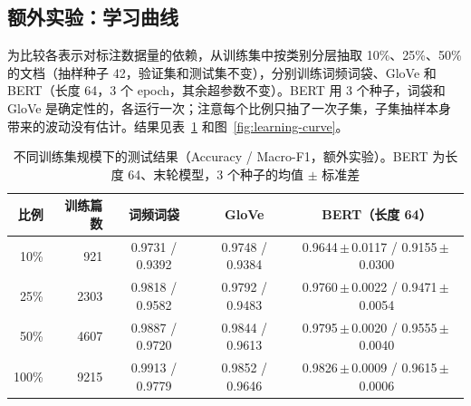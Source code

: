 \documentclass[lang=cn,a4paper]{elegantpaper}
\newcommand{\pmstd}[2]{#1\,$\pm$\,#2}
\begin{document}
\subsection{额外实验：学习曲线}
\label{sec:learning-curve}

为比较各表示对标注数据量的依赖，从训练集中按类别分层抽取 10\%、25\%、50\% 的文档（抽样种子 42，验证集和测试集不变），分别训练词频词袋、GloVe 和 BERT（长度 64，3 个 epoch，其余超参数不变）。BERT 用 3 个种子，词袋和 GloVe 是确定性的，各运行一次；注意每个比例只抽了一次子集，子集抽样本身带来的波动没有估计。结果见表~\ref{tab:learning-curve} 和图~\ref{fig:learning-curve}。

\begin{table}[htbp]
  \centering
  \caption{不同训练集规模下的测试结果（Accuracy / Macro-F1，额外实验）。BERT 为长度 64、末轮模型，3 个种子的均值 $\pm$ 标准差}
  \label{tab:learning-curve}
  \small
  \begin{tabular}{rrccc}
    \toprule
    比例 & 训练篇数 & 词频词袋 & GloVe & BERT（长度 64） \\
    \midrule
    10\% & 921 & 0.9731 / 0.9392 & 0.9748 / 0.9384 & \pmstd{0.9644}{0.0117} / \pmstd{0.9155}{0.0300} \\
    25\% & 2303 & 0.9818 / 0.9582 & 0.9792 / 0.9483 & \pmstd{0.9760}{0.0022} / \pmstd{0.9471}{0.0054} \\
    50\% & 4607 & 0.9887 / 0.9720 & 0.9844 / 0.9613 & \pmstd{0.9795}{0.0020} / \pmstd{0.9555}{0.0040} \\
    100\% & 9215 & 0.9913 / 0.9779 & 0.9852 / 0.9646 & \pmstd{0.9826}{0.0009} / \pmstd{0.9615}{0.0006} \\
    \bottomrule
  \end{tabular}
\end{table}
\end{document}
